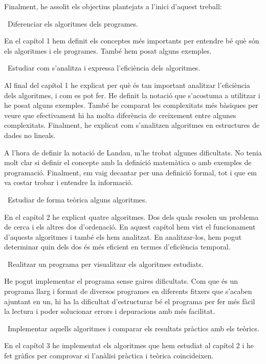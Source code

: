 Finalment, he assolit els objectius plantejats a l'inici d'aquest treball:

\quad \textbullet\  Diferenciar els algoritmes dels programes.

En el capítol 1 hem definit els conceptes més importants per entendre bé què són els algoritmes i els programes. També hem posat alguns exemples.

\quad \textbullet\ Estudiar com s'analitza i expressa l'eficiència dels algoritmes.

Al final del capítol 1 he explicat per què és tan important analitzar l'eficiència dels algoritmes, i com es pot fer. He definit la notació que s'acostuma a utilitzar i he posat alguns exemples. També he comparat les complexitats més bàsiques per veure que efectivament hi ha molta diferència de creixement entre algunes complexitats. Finalment, he explicat com s'analitzen algoritmes en estructures de dades no lineals.

A l'hora de definir la notació de Landau, m'he trobat algunes dificultats. No tenia molt clar si definir el concepte amb la definició matemàtica o amb exemples de programació. Finalment, em vaig decantar per una definició formal, tot i que em va costar trobar i entendre la informació. 

\newpage
\quad \textbullet\ Estudiar de forma teòrica alguns algoritmes.

En el capítol 2 he explicat quatre algoritmes. Dos dels quals resolen un problema de cerca i els altres dos d'ordenació. En aquest capítol hem vist el funcionament d'aquests algoritmes i també els hem analitzat. En analitzar-los, hem pogut determinar quin dels dos és més eficient en termes d'eficiència temporal.

\quad \textbullet\ Realitzar un programa per visualitzar els algoritmes estudiats.

He pogut implementar el programa sense gaires dificultats. Com que és un programa llarg i format de diversos programes en diferents fitxers que s'acaben ajuntant en un, hi ha la dificultat d'estructurar bé el programa per fer més fàcil la lectura i poder solucionar errors i depuracions amb més facilitat.

\quad \textbullet\ Implementar aquells algoritmes i comparar els resultats pràctics amb els teòrics.

En el capítol 3 he implementat els algoritmes que hem estudiat al capítol 2 i he fet gràfics per comprovar si l'anàlisi pràctica i teòrica coincideixen. 

